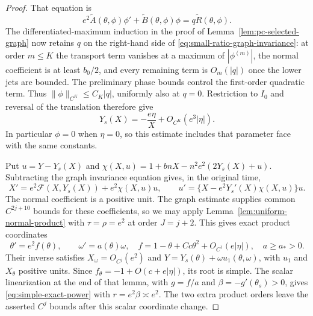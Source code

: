 \begin{proof}
That equation is
\begin{equation}\label{eq:small-ratio-graph-invariance}
 e^2\widetilde A(\theta,\phi)\phi'
       +\widetilde B(\theta,\phi)\phi
       =q\widetilde R(\theta,\phi).
\end{equation}
The differentiated-maximum induction in the proof of
Lemma~\ref{lem:pc-selected-graph} now retains $q$ on the right-hand
side of \eqref{eq:small-ratio-graph-invariance}: at order $m\le K$
the transport term vanishes at a maximum of $|\phi^{(m)}|$, the normal
coefficient is at least $b_0/2$, and every remaining term is $O_m(|q|)$
once the lower jets are bounded. The preliminary phase bounds control
the first-order quadratic term. Thus
$\|\phi\|_{C^K}\le C_K|q|$, uniformly also at $q=0$.
Restriction to
$I_0$ and reversal of the translation therefore give
\begin{equation}\label{eq:small-ratio-selected-graph}
 Y_s(X)=-\frac{e\eta}{X}+O_{C^K}(e^3|\eta|).
\end{equation}
In particular $\phi=0$ when $\eta=0$, so this estimate includes that
parameter face with the same constants.

Put $u=Y-Y_s(X)$ and
$\chi(X,u)=1+bnX-n^2e^2(2Y_s(X)+u)$. Subtracting the graph
invariance equation gives, in the original time,
\[
 X'=e^2\mathcal F(X,Y_s(X))+e^2\chi(X,u)u,\qquad
 u'=\{X-e^2Y_s'(X)\chi(X,u)\}u.
\]
The normal coefficient is a positive unit. The graph estimate supplies
common $C^{2j+10}$ bounds for these coefficients, so we may apply
Lemma~\ref{lem:uniform-normal-product} with $\tau=\rho=e^2$ at order
$J=j+2$. This gives exact product coordinates
\[
 \theta'=e^2f(\theta),\qquad \omega'=a(\theta)\omega,
 \quad f=1-\theta+Cc\theta^2+O_{C^1}(e|\eta|),\quad a\ge a_*>0.
\]
Their inverse satisfies $X_\omega=O_{C^j}(e^2)$ and
$Y=Y_s(\theta)+\omega u_1(\theta,\omega)$, with
$u_1$ and $X_\theta$ positive units. Since
$f_\theta=-1+O(c+e|\eta|)$, its root is simple. The scalar
linearization at the end of that lemma, with $g=f/a$ and
$\beta=-g'(\theta_s)>0$, gives \eqref{eq:simple-exact-power}
with $r=e^2\beta\asymp e^2$. The two extra product orders leave the
asserted $C^j$ bounds after this scalar coordinate change.


\end{proof}
